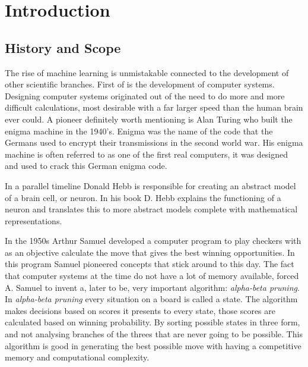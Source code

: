 
\chapter{Introduction}
\section{History and Scope}
The rise of machine learning is unmistakable connected to the development of other scientific branches.
First of is the development of computer systems.  
Designing computer systems originated out of the need to do more and more difficult calculations, most desirable with a far larger speed than the human brain ever could.
A pioneer definitely worth mentioning is Alan Turing who built the enigma machine in the 1940's.
Enigma was the name of the code that the Germans used to encrypt their transmissions in the second world war.
His enigma machine is often referred to as one of the first real computers, it was designed and used to crack this German enigma code.
\par
In a parallel timeline Donald Hebb is responsible for creating an abstract model of a brain cell, or neuron.\cite{HebbDonaldOlding1949Wiley}
In his book D. Hebb explains the functioning of a neuron and translates this to more abstract models complete with mathematical representations.
\par 
In the 1950s Arthur Samuel developed a computer program to play checkers with as an objective calculate the move that gives the best winning opportunities.\cite{McCarthy_Feigenbaum_1990} 
In this program Samuel pioneered concepts that stick around to this day.
The fact that computer systems at the time do not have a lot of memory available, forced A. Samuel to invent a, later to be, very important algorithm: \textit{alpha-beta pruning}.
In \textit{alpha-beta pruning} every situation on a board is called a state.
The algorithm makes decisions based on scores it presents to every state, those scores are calculated based on winning probability. 
By sorting possible states in three form, and not analysing branches of the threes that are never going to be possible.
This algorithm is good in generating the best possible move with having a competitive memory and computational complexity.
